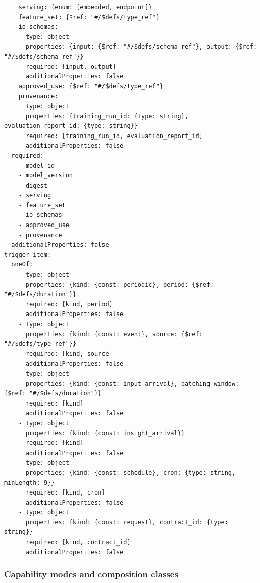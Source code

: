 \begin{verbatim}
    serving: {enum: [embedded, endpoint]}
    feature_set: {$ref: "#/$defs/type_ref"}
    io_schemas:
      type: object
      properties: {input: {$ref: "#/$defs/schema_ref"}, output: {$ref: "#/$defs/schema_ref"}}
      required: [input, output]
      additionalProperties: false
    approved_use: {$ref: "#/$defs/type_ref"}
    provenance:
      type: object
      properties: {training_run_id: {type: string}, evaluation_report_id: {type: string}}
      required: [training_run_id, evaluation_report_id]
      additionalProperties: false
  required:
    - model_id
    - model_version
    - digest
    - serving
    - feature_set
    - io_schemas
    - approved_use
    - provenance
  additionalProperties: false
trigger_item:
  oneOf:
    - type: object
      properties: {kind: {const: periodic}, period: {$ref: "#/$defs/duration"}}
      required: [kind, period]
      additionalProperties: false
    - type: object
      properties: {kind: {const: event}, source: {$ref: "#/$defs/type_ref"}}
      required: [kind, source]
      additionalProperties: false
    - type: object
      properties: {kind: {const: input_arrival}, batching_window: {$ref: "#/$defs/duration"}}
      required: [kind]
      additionalProperties: false
    - type: object
      properties: {kind: {const: insight_arrival}}
      required: [kind]
      additionalProperties: false
    - type: object
      properties: {kind: {const: schedule}, cron: {type: string, minLength: 9}}
      required: [kind, cron]
      additionalProperties: false
    - type: object
      properties: {kind: {const: request}, contract_id: {type: string}}
      required: [kind, contract_id]
      additionalProperties: false
\end{verbatim}

\hypertarget{a.1.4-capability-modes-and-composition-classes}{%
\subsubsection{Capability modes and composition classes}\label{a.1.4-capability-modes-and-composition-classes}}

